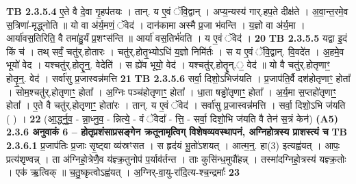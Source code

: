 \documentclass[17pt]{extarticle}
\begin{document}
                  \newline
                                \textbf{ TB 2.3.5.4} \newline
                  ए॒ते वै दे॒वा गृ॒हप॑तयः । तान्. य ए॒वं ॅवि॒द्वान् । अप्य॒न्यस्य॑ गार्.हप॒ते दीक्ष॑ते । अ॒वा॒न्त॒रमे॒व स॒त्रिणा॑-मृद्ध्नोति ॥ यो वा अ॑र्य॒मणं॒ ॅवेद॑ । दान॑कामा अस्मै प्र॒जा भ॑वन्ति । य॒ज्ञो वा अ॑र्य॒मा । आर्या॑वस॒तिरिति॒ वै तमा॑हु॒र्यं प्र॒शꣳस॑न्ति ॥ आर्या॑ वस॒तिर्भ॑वति । य ए॒वं ॅवेद॑ । \textbf{ 20} \newline
                  \newline
                                \textbf{ TB 2.3.5.5} \newline
                  यद्वा इ॒दं किं च॑ । तथ् सर्वं॒ चतु॑र्.होतारः । चतु॑र्.होतृ॒भ्योऽधि॑ य॒ज्ञो निमि॑र्तः । स य ए॒वं ॅवि॒द्वान्. वि॒वदे॑त । अ॒हमे॒व भूयो॑ वेद । यश्चतु॑र्.होतॄ॒न्॒. वेदेति॑ । स ह्ये॑व भूयो॒ वेद॑ । यश्चतु॑र्.होतॄ॒न्.॒ वेद॑ ॥ यो वै चतु॑र्.होतृणाꣳ॒॒ होतॄ॒न्॒. वेद॑ । सर्वा॑सु प्र॒जास्वन्न॑मत्ति \textbf{ 21} \newline
                  \newline
                                \textbf{ TB 2.3.5.6} \newline
                  सर्वा॒ दिशो॒ऽभिज॑यति । प्र॒जाप॑ति॒र्वै दश॑होतृणाꣳ॒॒ होता᳚ । सोम॒श्चतु॑र्.होतृणाꣳ॒॒ होता᳚ । अ॒ग्निः पञ्च॑होतृणाꣳ॒॒ होता᳚ । धा॒ता षड्ढो॑तृणाꣳ॒॒ होता᳚ । अ॒र्य॒मा स॒प्तहो॑तृणाꣳ॒॒ होता᳚ । ए॒ते वै चतु॑र्.होतृणाꣳ॒॒ होता॑रः । तान्. य ए॒वं ॅवेद॑ । सर्वा॑सु प्र॒जास्वन्न॑मत्ति । सर्वा॒ दिशो॒ऽभि ज॑यति ( ) । \textbf{ 22} \newline
                  \newline
                                    (आ॒र्द्ध्नु॒व॒ - न्ना॒ध्नु॒व॒ - न्नित्ये॒ - वं ॅवेदा᳚ - त्ति॒ - सर्वा॒ दिशो॒भि ज॑यति वै तेन॑ स॒त्रं केन॑) \textbf{(A5)} \newline \newline
                \textbf{ 2.3.6     अनुवाकं   6 –  होतृप्रशंसाप्रसङ्गेन क्रतूनामृत्विग् विशेषव्यवस्थापनं, अग्निहोत्रस्य प्राशस्त्यं च} \newline
                                \textbf{ TB 2.3.6.1} \newline
                  प्र॒जाप॑तिः प्र॒जाः सृ॒ष्ट्वा व्य॑स्रꣳसत । स हृद॑यं भू॒तो॑ऽशयत् । आत्म॒न्॒. हा(3) इत्यह्व॑यत् । आपः॒ प्रत्य॑शृण्वन्न् । ता अ॑ग्निहो॒त्रेणै॒व य॑ज्ञ्क्र॒तुनोप॑ प॒र्याव॑र्तन्त । ताः कुसि॑न्ध॒मुपौ॑हन्न् । तस्मा॑दग्निहो॒त्रस्य॑ यज्ञ्क्र॒तोः । एक॑ ऋ॒त्विक् ॥ च॒तु॒ष्कृत्वोऽह्व॑यत् । अ॒ग्निर्-वा॒यु-रा॑दि॒त्य-श्च॒न्द्रमाः᳚ \textbf{ 23} \newline
\end{document}
